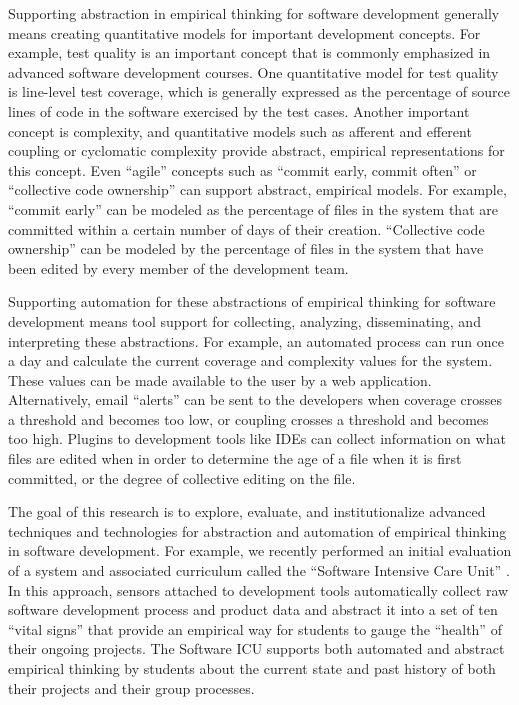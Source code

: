 Supporting abstraction in empirical thinking for software development
generally means creating quantitative models for important development
concepts.  For example, test quality is an important concept that is
commonly emphasized in advanced software development courses.  One
quantitative model for test quality is line-level test coverage, which is
generally expressed as the percentage of source lines of code in the
software exercised by the test cases.  Another important concept is
complexity, and quantitative models such as afferent and efferent coupling
or cyclomatic complexity provide abstract, empirical representations
for this concept.  Even ``agile'' concepts such as ``commit early, commit
often'' or ``collective code ownership'' can support abstract, empirical
models. For example, ``commit early'' can be modeled as the percentage of
files in the system that are committed within a certain number of days of
their creation.  ``Collective code ownership'' can be modeled by the
percentage of files in the system that have been edited by every member of
the development team.

Supporting automation for these abstractions of empirical thinking for
software development means tool support for collecting, analyzing,
disseminating, and interpreting these abstractions.  For example, an
automated process can run once a day and calculate the current coverage and
complexity values for the system.  These values can be made available to
the user by a web application. Alternatively, email ``alerts'' can be sent
to the developers when coverage crosses a threshold and becomes too low, or
coupling crosses a threshold and becomes too high.  Plugins to development
tools like IDEs can collect information on what files are edited when in
order to determine the age of a file when it is first committed, or the
degree of collective editing on the file.

The goal of this research is to explore, evaluate, and institutionalize
advanced techniques and technologies for abstraction and automation of
empirical thinking in software development.  For example, we recently performed
an initial evaluation of a system and associated curriculum called the
``Software Intensive Care Unit'' \citep{csdl2-09-02}.  In this approach,
sensors attached to development tools automatically collect raw software
development process and product data and abstract it into a set of ten
``vital signs'' that provide an empirical way for students to gauge the
``health'' of their ongoing projects.  The Software ICU supports both
automated and abstract empirical thinking by students about the current
state and past history of both their projects and their group processes.

